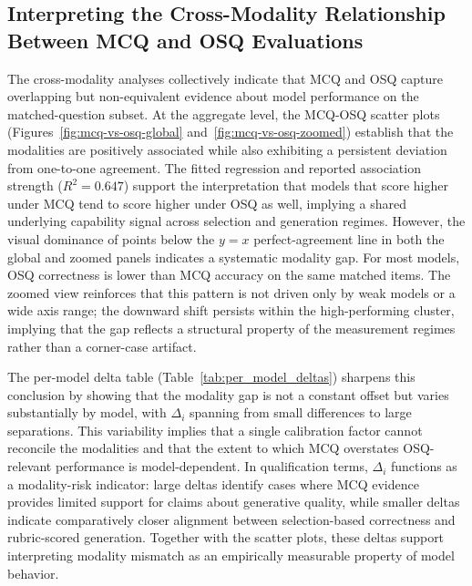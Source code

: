 \subsection{Interpreting the Cross-Modality Relationship Between MCQ and OSQ Evaluations }

The cross-modality analyses collectively indicate that MCQ and OSQ capture overlapping but non-equivalent evidence about model performance on the matched-question subset. At the aggregate level, the MCQ-OSQ scatter plots (Figures~\ref{fig:mcq-vs-osq-global} and~\ref{fig:mcq-vs-osq-zoomed}) establish that the modalities are positively associated while also exhibiting a persistent deviation from one-to-one agreement. The fitted regression and reported association strength (\(R^2=0.647\)) support the interpretation that models that score higher under MCQ tend to score higher under OSQ as well, implying a shared underlying capability signal across selection and generation regimes. However, the visual dominance of points below the \(y=x\) perfect-agreement line in both the global and zoomed panels indicates a systematic modality gap. For most models, OSQ correctness is lower than MCQ accuracy on the same matched items. The zoomed view reinforces that this pattern is not driven only by weak models or a wide axis range; the downward shift persists within the high-performing cluster, implying that the gap reflects a structural property of the measurement regimes rather than a corner-case artifact.

The per-model delta table (Table~\ref{tab:per_model_deltas}) sharpens this conclusion by showing that the modality gap is not a constant offset but varies substantially by model, with \(\Delta_i\) spanning from small differences to large separations. This variability implies that a single calibration factor cannot reconcile the modalities and that the extent to which MCQ overstates OSQ-relevant performance is model-dependent. In qualification terms, \(\Delta_i\) functions as a modality-risk indicator: large deltas identify cases where MCQ evidence provides limited support for claims about generative quality, while smaller deltas indicate comparatively closer alignment between selection-based correctness and rubric-scored generation. Together with the scatter plots, these deltas support interpreting modality mismatch as an empirically measurable property of model behavior.

